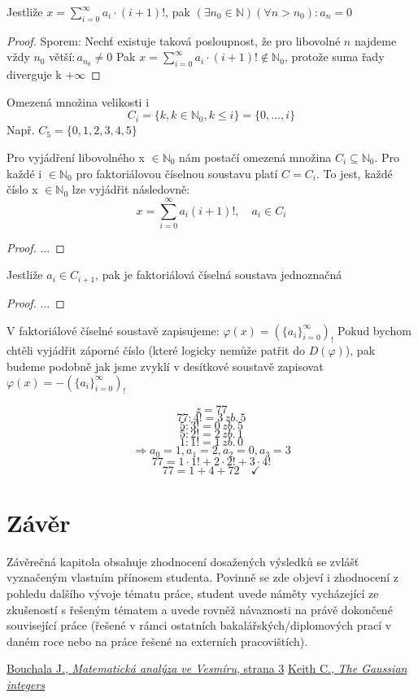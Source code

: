 \documentclass[czech,bachelor,dept470,male]{diploma}
\newcommand{\posla}{\{a_i\}_{i=0}^{\infty}}
\begin{document}
\begin{theorem}
	Jestliže $x=\sum_{i=0}^{\infty}a_i\cdot(i+1)!$, pak $(\exists n_0 \in \mathbb{N})(\forall n>n_0):a_n=0$
\end{theorem}
\begin{proof}
	Sporem: \newline Nechť existuje taková posloupnost, že pro libovolné $n$ najdeme vždy $n_0$ větší$:a_{n_0}\ne0$\newline
	Pak $x=\sum_{i=0}^\infty a_i\cdot(i+1)! \notin \mathbb{N}_0$, protože suma řady diverguje k $+\infty$
\end{proof}
\begin{definition}
	Omezená množina velikosti i\newline
	$$C_i=\{k,k\in\mathbb{N}_0,k\le i\}=\{0,\dots,i\}$$
	Např. $C_5 = \{0,1,2,3,4,5\}$
\end{definition}
\begin{theorem}
	Pro vyjádření libovolného x $\in\mathbb{N}_0$ nám postačí omezená množina $C_i\subseteq\mathbb{N}_0$. Pro každé i $\in \mathbb{N}_0$ pro faktoriálovou číselnou soustavu platí $C=C_i$. To jest, každé číslo x $\in\mathbb{N}_0$ lze vyjádřit následovně:
	$$x=\sum_{i=0}^{\infty}a_i(i+1)!,\quad a_i\in C_i$$
\end{theorem}
\begin{proof}
	...
\end{proof}
\begin{theorem}
	Jestliže $a_i \in C_{i+1}$, pak je faktoriálová číselná soustava jednoznačná
\end{theorem}
\begin{proof}
	...
\end{proof}
\begin{agreement}
	V faktoriálové číselné soustavě zapisujeme:
	$\varphi(x) =  (\posla)_!$\newline
	Pokud bychom chtěli vyjádřit záporné číslo (které logicky nemůže patřit do $D(\varphi)$), pak budeme podobně jak jsme zvyklí v desítkové soustavě zapisovat $\varphi(x) = - (\posla)_!$
\end{agreement}

\begin{example}
	$$z=77$$
	$$77:4!=3\,zb.\,5$$
	$$5:3!=0\,zb.\,5$$
	$$5:2!=2\,zb.\,1$$
	$$1:1!=1\,zb.\,0$$
	$$\Rightarrow a_0=1, a_1=2,a_2=0,a_3=3$$
	$$ 77 = 1 \cdot 1! + 2 \cdot 2! + 3\cdot 4!$$
	$$ 77 = 1 + 4 + 72 \quad \checkmark$$
\end{example}

\section{Závěr}
Závěrečná kapitola obsahuje zhodnocení dosažených výsledků se zvlášť vyznačeným vlastním přínosem studenta. Povinně
se zde objeví i zhodnocení z pohledu dalšího vývoje tématu práce, student uvede náměty vycházející ze zkušeností s řešeným
tématem a uvede rovněž návaznosti na právě dokončené související práce (řešené v rámci ostatních bakalářských/diplomových
prací v daném roce nebo na práce řešené na externích pracovištích).

\begin{thebibliography}{1}
	 \href{https://homel.vsb.cz/~bou10/MA1/4.pdf}{Bouchala J., \emph{Matematická analýza ve Vesmíru}, strana 3}
	 \href{https://kconrad.math.uconn.edu/blurbs/ugradnumthy/Zinotes.pdf}{Keith C., \emph{The Gaussian integers}}
\end{thebibliography}
\end{document}
